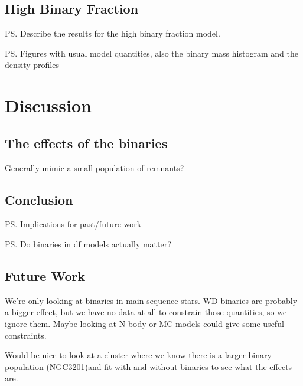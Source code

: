 \subsection{High Binary Fraction}
\ps{Describe the results for the high binary fraction model.}

\ps{Figures with usual model quantities, also the binary mass histogram and the density profiles}

\section{Discussion}

\subsection{The effects of the binaries}

Generally mimic a small population of remnants?


\subsection{Conclusion}

\ps{Implications for past/future work}

\ps{Do binaries in df models actually matter?}



\subsection{Future Work}

We're only looking at binaries in main sequence stars. WD binaries are probably a bigger effect, but
we have no data at all to constrain those quantities, so we ignore them. Maybe looking at N-body or
MC models could give some useful constraints.

Would be nice to look at a cluster where we know there is a larger binary population (NGC3201)and
fit with and without binaries to see what the effects are.